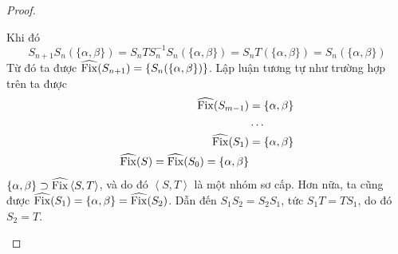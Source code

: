\begin{proof}
\begin{enumerate}
        Khi đó 
        \[S_{n+1}S_n(\{\alpha, \beta\}) = S_nTS_n^{-1}S_n(\{\alpha, \beta\}) = S_nT(\{\alpha, \beta\}) = S_n(\{\alpha, \beta\})\]
        Từ đó ta được $\widehat{\operatorname{Fix}}(S_{n+1}) = \{S_n(\{\alpha, \beta\})\}$. Lập luận tương tự như trường hợp trên ta được 
        \begin{align*}
            \widehat{\operatorname{Fix}}(S_{m-1}) &= \{\alpha, \beta\}\\
            &\ldots  \\
            \widehat{\operatorname{Fix}}(S_{1}) &= \{\alpha, \beta\}\\
            \widehat{\operatorname{Fix}}(S) = \widehat{\operatorname{Fix}}(S_{0}) =  \{\alpha, \beta\}
        \end{align*}
        $\{\alpha, \beta\} \supset \widehat{\operatorname{Fix}}\left<S,T\right>$, và do đó $\left<S,T\right>$ là một nhóm sơ cấp. Hơn nữa, ta cũng được $\widehat{\operatorname{Fix}}(S_{1}) = \{\alpha, \beta\} = \widehat{\operatorname{Fix}}(S_{2})$. Dẫn đến $S_1S_2=S_2S_1$, tức $S_1T = TS_1$, do đó $S_2 = T$.
    \end{enumerate}
\end{proof}

